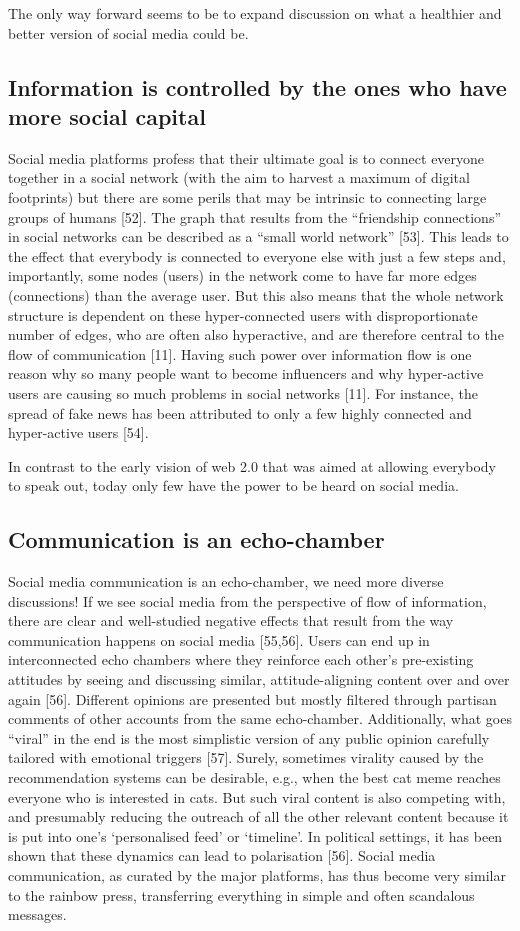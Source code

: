 \documentclass{sistedes}
\begin{document}
The only way forward seems to be to expand discussion on what a healthier and better version of social media could be.

\subsection{Information is controlled by the ones who have more social capital}
Social media platforms profess that their ultimate goal is to connect everyone together in a social network (with the aim to harvest a maximum of digital footprints) but there are some perils that may be intrinsic to connecting large groups of humans [52]. The graph that results from the “friendship connections” in social networks can be described as a “small world network” [53]. This leads to the effect that everybody is connected to everyone else with just a few steps and, importantly, some nodes (users) in the network come to have far more edges (connections) than the average user. But this also means that the whole network structure is dependent on these hyper-connected users with disproportionate number of edges, who are often also hyperactive, and are therefore central to the flow of communication [11]. Having such power over information flow is one reason why so many people want to become influencers and why hyper-active users are causing so much problems in social networks [11]. For instance, the spread of fake news has been attributed to only a few highly connected and hyper-active users [54].

In contrast to the early vision of web 2.0 that was aimed at allowing everybody to speak out, today only few have the power to be heard on social media.

\subsection{Communication is an echo-chamber}
Social media communication is an echo-chamber, we need more diverse discussions!
If we see social media from the perspective of flow of information, there are clear and well-studied negative effects that result from the way communication happens on social media [55,56]. Users can end up in interconnected echo chambers where they reinforce each other’s pre-existing attitudes by seeing and discussing similar, attitude-aligning content over and over again [56]. Different opinions are presented but mostly filtered through partisan comments of other accounts from the same echo-chamber. Additionally, what goes “viral” in the end is the most simplistic version of any public opinion carefully tailored with emotional triggers [57]. Surely, sometimes virality caused by the recommendation systems can be desirable, e.g., when the best cat meme reaches everyone who is interested in cats. But such viral content is also competing with, and presumably reducing the outreach of all the other relevant content because it is put into one’s ‘personalised feed’ or ‘timeline’. In political settings, it has been shown that these dynamics can lead to polarisation [56]. Social media communication, as curated by the major platforms, has thus become very similar to the rainbow press, transferring everything in simple and often scandalous messages.
\end{document}
